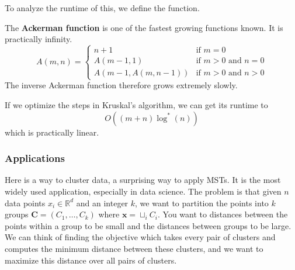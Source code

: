   To analyze the runtime of this, we define the function. 

  \begin{definition}
    \label{def:ackerman-function}
    The \textbf{Ackerman function} is one of the fastest growing functions known. It is practically infinity. 
    \begin{equation}
      A(m,n) = 
      \begin{cases} 
        n+1 & \text{if } m = 0 \\
        A(m-1,1) & \text{if } m > 0 \text{ and } n = 0 \\
        A(m-1,A(m,n-1)) & \text{if } m > 0 \text{ and } n > 0
      \end{cases} 
    \end{equation}
    The inverse Ackerman function therefore grows extremely slowly. 
  \end{definition}

  If we optimize the steps in Kruskal's algorithm, we can get its runtime to 
  \begin{equation}
    O((m + n) \log^{\ast} (n))
  \end{equation}
  which is practically linear. 

\subsubsection{Applications}

  Here is a way to cluster data, a surprising way to apply MSTs. It is the most widely used application, especially in data science. The problem is that given $n$ data points $x_i \in \mathbb{R}^d$ and an integer $k$, we want to partition the points into $k$ groups $\mathbf{C} = (C_1, \ldots, C_k)$ where $\mathbf{x} = \sqcup_i C_i$. You want to distances between the points within a group to be small and the distances between groups to be large. We can think of finding the objective which takes every pair of clusters and computes the minimum distance between these clusters, and we want to maximize this distance over all pairs of clusters.  

